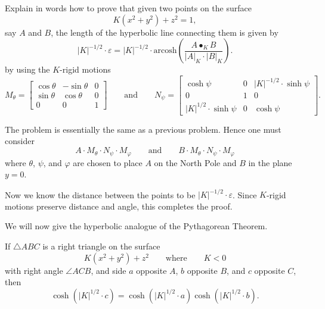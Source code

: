 \documentclass[newpage,hints,,12pt,noauthor,nooutcomes,handout]{ximera}
\begin{document}
\begin{problem}
  Explain in words how to prove that given two points on the surface
  \[
  K(x^2 + y^2) + z^2 =1,
  \]
  say $A$ and $B$, the length of the hyperbolic line connecting them
  is given by
  \[
  |K|^{-1/2}\cdot \varepsilon = |K|^{-1/2} \cdot \mathrm{arcosh}
  \left(\frac{A\bullet_K B}{|A|_K\cdot |B|_K}\right).
  \]
  by using the $K$-rigid motions
  \[
   M_\theta=
  \begin{bmatrix}
    \cos\theta & -\sin\theta & 0\\
    \sin\theta & \cos\theta & 0\\
    0 & 0 & 1
  \end{bmatrix}
  \qquad\text{and}\qquad
 N_\psi=
  \begin{bmatrix}
    \cosh\psi & 0 & |K|^{-1/2}\cdot\sinh\psi\\
    0 & 1 & 0\\
    |K|^{1/2}\cdot\sinh\psi & 0 & \cosh\psi
  \end{bmatrix}.
  \]
  \begin{freeResponse}
    The problem is essentially the same as a previous problem. Hence one must consider
    \[
    A\cdot M_\theta\cdot N_\psi\cdot M_\varphi \qquad\text{and}\qquad
    B\cdot M_\theta\cdot N_\psi\cdot M_\varphi
    \]
    where $\theta$, $\psi$, and $\varphi$ are chosen to place $A$ on
    the North Pole and $B$ in the plane $y=0$.

    Now we know the distance between the points to be
    $|K|^{-1/2}\cdot\varepsilon$. Since $K$-rigid motions preserve
    distance and angle, this completes the proof.
  \end{freeResponse}
\end{problem}


We will now give the hyperbolic analogue of the Pythagorean Theorem.

\begin{theorem}
  If $\triangle ABC$ is a right triangle on the surface
  \[
  K(x^2+y^2)+z^2\qquad\text{where}\qquad K<0
  \]
  with right angle $\angle ACB$, and side $a$ opposite $A$,
  $b$ opposite $B$, and $c$ opposite $C$, then
  \[
  \cosh\left(|K|^{1/2}\cdot c\right)=\cosh\left(|K|^{1/2}\cdot a\right)\cosh\left(|K|^{1/2}\cdot b\right).
  \]
\end{theorem}
\end{document}
